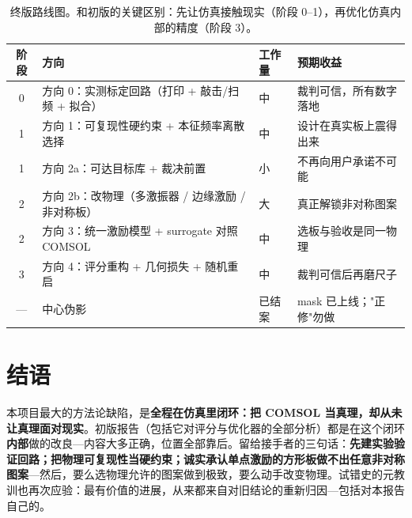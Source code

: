 \documentclass[11pt,a4paper]{article}
\begin{document}
\begin{table}[h]
\centering
\small
\begin{tabular}{@{}clll@{}}
\toprule
阶段 & 方向 & 工作量 & 预期收益 \\
\midrule
0 & 方向 0：实测标定回路（打印 + 敲击/扫频 + 拟合） & 中 & 裁判可信，所有数字落地 \\
1 & 方向 1：可复现性硬约束 + 本征频率离散选择 & 中 & 设计在真实板上震得出来 \\
1 & 方向 2a：可达目标库 + 裁决前置 & 小 & 不再向用户承诺不可能 \\
2 & 方向 2b：改物理（多激振器 / 边缘激励 / 非对称板） & 大 & 真正解锁非对称图案 \\
2 & 方向 3：统一激励模型 + surrogate 对照 COMSOL & 中 & 选板与验收是同一物理 \\
3 & 方向 4：评分重构 + 几何损失 + 随机重启 & 中 & 裁判可信后再磨尺子 \\
--- & 中心伪影 & 已结案 & mask 已上线；"正修"勿做 \\
\bottomrule
\end{tabular}
\caption{终版路线图。和初版的关键区别：先让仿真接触现实（阶段 0--1），再优化仿真内部的精度（阶段 3）。}
\end{table}

\section{结语}

本项目最大的方法论缺陷，是\textbf{全程在仿真里闭环：把 COMSOL 当真理，却从未让真理面对现实}。初版报告（包括它对评分与优化器的全部分析）都是在这个闭环\textbf{内部}做的改良---内容大多正确，位置全部靠后。留给接手者的三句话：\textbf{先建实验验证回路；把物理可复现性当硬约束；诚实承认单点激励的方形板做不出任意非对称图案}---然后，要么选物理允许的图案做到极致，要么动手改变物理。试错史的元教训也再次应验：最有价值的进展，从来都来自对旧结论的重新归因---包括对本报告自己的。
\end{document}
